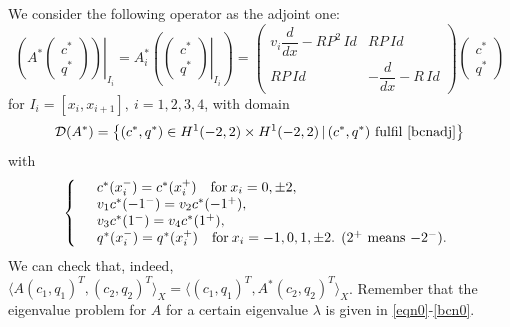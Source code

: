 \documentclass[a4paper]{article}
\numberwithin{equation}{section}
\begin{document}
We consider the following operator as the adjoint one:
\begin{equation}\label{eqnadj}
\left.\left(A^*\begin{pmatrix} c^*\\ q^*\end{pmatrix}\right)\right|_{I_i}=A_i^*\left(\left.\begin{pmatrix} c^*\\ q^*\end{pmatrix}\right|_{I_i}\right)= \begin{pmatrix}  v_i\dfrac{d}{dx}-RP^2\, Id & RP\,Id\\ RP\,Id & -\dfrac{d}{dx}-R\,Id\end{pmatrix} \begin{pmatrix} c^*\\ q^*\end{pmatrix}
\end{equation}
for $I_i=[x_i,x_{i+1}],\ i = 1,2,3,4$, with domain
$$\mathcal{D}(A^*)= \left\{  (c^*,q^*)\in H^1(-2,2)\times H^1(-2,2)\, |\, (c^*,q^*) \textrm{ fulfil } \eqref{bcnadj} \right\}$$
with
\begin{equation}\label{bcnadj}
\left\{ \begin{array}{ll}
  &c^*(x_i^-)=c^*(x_i^+) \quad \hbox{for}\: x_i=0,\pm 2,\\
  &v_1c^*(-1^-)=v_2c^*(-1^+),\\
  &v_3c^*(1^-)= v_4c^*(1^+), \\
  &q^*(x_i^-)=q^*(x_i^+) \quad \hbox{for}\: x_i=-1,0,1,\pm 2 \hbox{. ($2^+$ means $-2^-$)}.
\end{array}\right.
\end{equation}
We can check that, indeed, $\langle A (c_1,q_1)^T, (c_2,q_2)^T\rangle_X = \langle (c_1,q_1)^T,A^*(c_2,q_2)^T\rangle_X$.
Remember that the eigenvalue problem for $A$ for a certain eigenvalue $\lambda$ is given in \eqref{eqn0}-\eqref{bcn0}.
\end{document}
